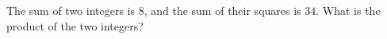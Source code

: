 The sum of two integers is $8$, and the sum of their squares is $34$. What is the product of the two integers?
